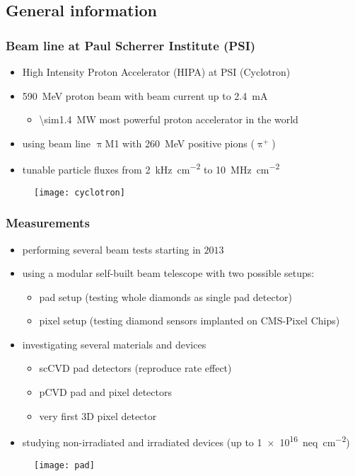 \subsection{General information}
\begin{frame}
	\frametitle{Beam line at Paul Scherrer Institute (PSI)}
	\begin{itemize}
		\setlength{\itemsep}{\fill}
		\item High Intensity Proton Accelerator (HIPA) at PSI (Cyclotron)
		\item \SI{590}{\mega\electronvolt} proton beam with beam current up to \SI{2.4}{\milli\ampere}
		\begin{itemize}
			\vspace*{4pt}
			\item \SI{\sim1.4}{\mega\watt} \ra most powerful proton accelerator in the world
		\end{itemize}
		\item using beam line $\uppi$M1 with \SI{260}{\mega\electronvolt} positive pions ($\uppi^+$)
		\item tunable particle fluxes from \SI{2}{\kilo\hertz\per cm^2} to \SI{10}{\mega\hertz\per cm^2}
	\end{itemize}
	\begin{figure}
		\centering
		\texttt{[image: cyclotron]}
	\end{figure}
\end{frame}
\begin{frame}
	\frametitle{Measurements}
	\begin{itemize}
		\item performing several beam tests starting in $2013$
		\item using a modular self-built beam telescope with two possible setups:
			\begin{itemize}
				\item pad setup (testing whole diamonds as single pad detector)
				\item pixel setup (testing diamond sensors implanted on CMS-Pixel Chips)
			\end{itemize}
		\item investigating several materials and devices
		\begin{itemize}
			\item scCVD pad detectors (reproduce rate effect)
			\item pCVD pad and pixel detectors
			\item very first 3D pixel detector
		\end{itemize}
		\item studying non-irradiated and irradiated devices (up to \SI{1e16}{neq\per cm^2})
	\end{itemize}
	\begin{figure}
		\centering
		\texttt{[image: pad]}
	\end{figure}
\end{frame}
